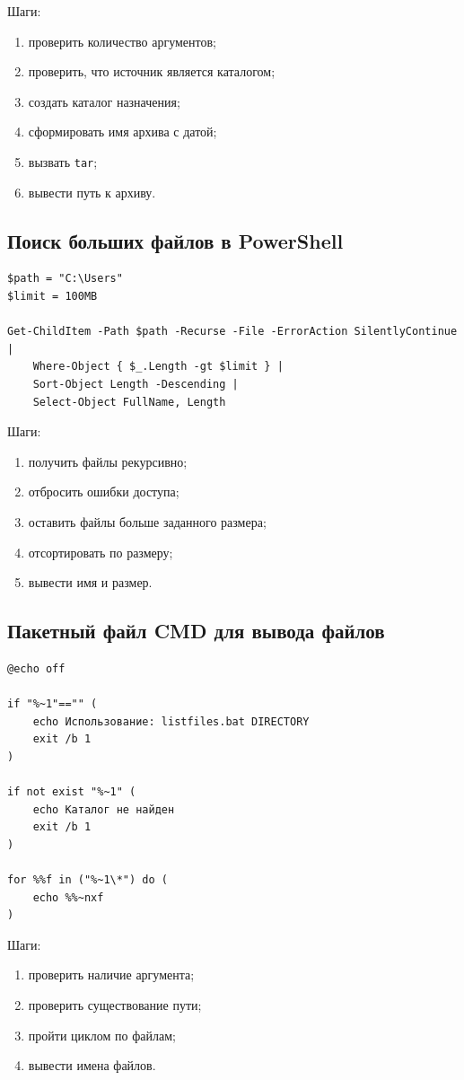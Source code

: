 \documentclass[12pt,a4paper]{article}
\begin{document}
Шаги:
\begin{enumerate}
    \item проверить количество аргументов;
    \item проверить, что источник является каталогом;
    \item создать каталог назначения;
    \item сформировать имя архива с датой;
    \item вызвать \texttt{tar};
    \item вывести путь к архиву.
\end{enumerate}

\subsection{Поиск больших файлов в PowerShell}

\begin{lstlisting}
$path = "C:\Users"
$limit = 100MB

Get-ChildItem -Path $path -Recurse -File -ErrorAction SilentlyContinue |
    Where-Object { $_.Length -gt $limit } |
    Sort-Object Length -Descending |
    Select-Object FullName, Length
\end{lstlisting}

Шаги:
\begin{enumerate}
    \item получить файлы рекурсивно;
    \item отбросить ошибки доступа;
    \item оставить файлы больше заданного размера;
    \item отсортировать по размеру;
    \item вывести имя и размер.
\end{enumerate}

\subsection{Пакетный файл CMD для вывода файлов}

\begin{lstlisting}
@echo off

if "%~1"=="" (
    echo Использование: listfiles.bat DIRECTORY
    exit /b 1
)

if not exist "%~1" (
    echo Каталог не найден
    exit /b 1
)

for %%f in ("%~1\*") do (
    echo %%~nxf
)
\end{lstlisting}

Шаги:
\begin{enumerate}
    \item проверить наличие аргумента;
    \item проверить существование пути;
    \item пройти циклом по файлам;
    \item вывести имена файлов.
\end{enumerate}
\end{document}
